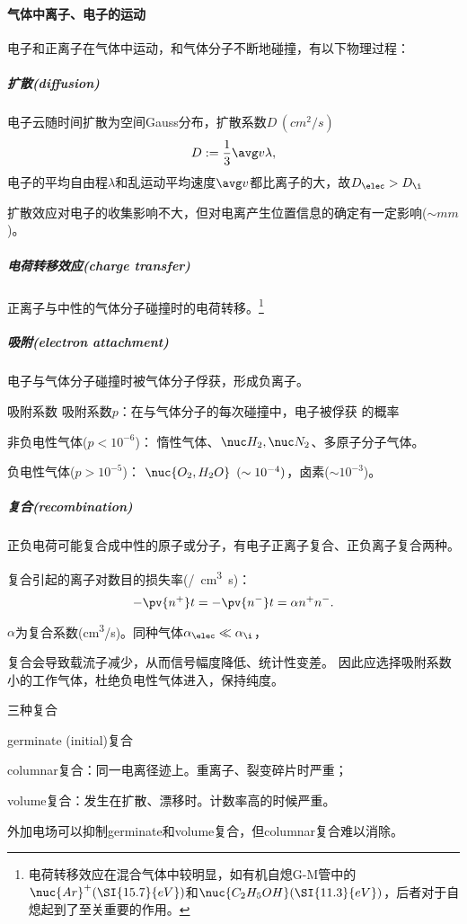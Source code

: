 \paragraph{气体中离子、电子的运动}
电子和正离子在气体中运动，和气体分子不断地碰撞，有以下物理过程：
\subparagraph{扩散(diffusion)}
电子云随时间扩散为空间Gauss分布，扩散系数$D\,(\si{cm^2/s})$
\[
	D:=\frac13\avg v\lambda,
\]
电子的平均自由程$\lambda$和乱运动平均速度$\avg v$都比离子的大，故$D_\elec>D_\i$

扩散效应对电子的收集影响不大，但对电离产生位置信息的确定有一定影响($\sim\si{mm}$)。
\subparagraph{电荷转移效应(charge transfer)}
正离子与中性的气体分子碰撞时的电荷转移。\footnote{电荷转移效应在混合气体中较明显，如有机自熄G-M管中的$\nuc{Ar}^+(\SI{15.7}{eV})$和$\nuc{C_2H_5OH}(\SI{11.3}{eV})$，后者对于自熄起到了至关重要的作用。}

\subparagraph{吸附(electron attachment)}
电子与气体分子碰撞时被气体分子俘获，形成负离子。
\begin{definition}{吸附系数}{}
	吸附系数$p$：在与气体分子的每次碰撞中，电子被俘获%
	的概率%
	\begin{compactitem}
		\item 非负电性气体($p<10^{-6}$)：
		惰性气体、$\nuc H_2,\nuc N_2$、多原子分子气体。
		\item 负电性气体($p>10^{-5}$)：
		$\nuc{O_2,H_2O}\enspace (\sim 10^{-4})$，卤素($\sim 10^{-3}$)。
	\end{compactitem}
\end{definition}
\subparagraph{复合(recombination)}
正负电荷可能复合成中性的原子或分子，有电子正离子复合、正负离子复合两种。

复合引起的离子对数目的损失率(\si{/cm^3.s})：
\[
	-\pv{n^+}t=-\pv{n^-}t=\alpha n^+n^-.
\]
$\alpha$为复合系数(\si{cm^3/s})。同种气体$\alpha_\elec\ll\alpha_\i$，

复合会导致载流子减少，从而信号幅度降低、统计性变差。%
因此应选择吸附系数小的工作气体，杜绝负电性气体进入，保持纯度。
\begin{definition}{三种复合}{}
	\begin{compactitem}
		\item germinate (initial)复合
		\item columnar复合：同一电离径迹上。重离子、裂变碎片时严重；
		\item volume复合：发生在扩散、漂移时。计数率高的时候严重。
	\end{compactitem}
\end{definition}
\noindent
外加电场可以抑制germinate和volume复合，但columnar复合难以消除。

